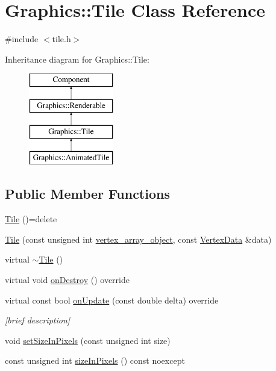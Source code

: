 \hypertarget{class_graphics_1_1_tile}{}\section{Graphics\+:\+:Tile Class Reference}
\label{class_graphics_1_1_tile}


{\ttfamily \#include $<$tile.\+h$>$}

Inheritance diagram for Graphics\+:\+:Tile\+:\begin{figure}[H]
\begin{center}
\leavevmode
\includegraphics[height=4.000000cm]{class_graphics_1_1_tile}
\end{center}
\end{figure}
\subsection*{Public Member Functions}
\begin{DoxyCompactItemize}
\item 
\hyperlink{class_graphics_1_1_tile_a86a26aa6bec494b668d20be672843fee}{Tile} ()=delete
\item 
\hyperlink{class_graphics_1_1_tile_a861a8afb0c7322b145614c5c119a140a}{Tile} (const unsigned int \hyperlink{class_graphics_1_1_renderable_aabfa91ebff7b10decd54119d663044ef}{vertex\+\_\+array\+\_\+object}, const \hyperlink{class_graphics_1_1_vertex_data}{Vertex\+Data} \&data)
\item 
virtual \hyperlink{class_graphics_1_1_tile_a2bc2b71c90b1067ebc7f2f5fbf871524}{$\sim$\+Tile} ()
\item 
virtual void \hyperlink{class_graphics_1_1_tile_a28f5bdfa2fc61b292dda7ec15316b981}{on\+Destroy} () override
\item 
virtual const bool \hyperlink{class_graphics_1_1_tile_a0311b1d9548f6badc9e81820b110cbb4}{on\+Update} (const double delta) override
\begin{DoxyCompactList}\small\item\em \mbox{[}brief description\mbox{]} \end{DoxyCompactList}\item 
void \hyperlink{class_graphics_1_1_tile_acb61c259a174f0fda3adef70be96cb23}{set\+Size\+In\+Pixels} (const unsigned int size)
\item 
const unsigned int \hyperlink{class_graphics_1_1_tile_a0d490b7e8374d401b8fe8cbef57a6a3a}{size\+In\+Pixels} () const noexcept
\end{DoxyCompactItemize}
